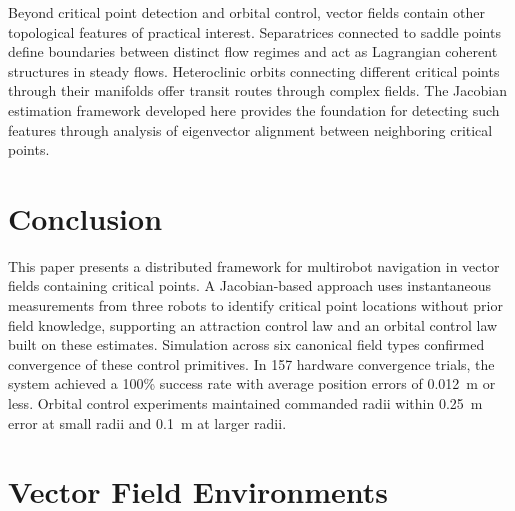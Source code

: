 \documentclass[lettersize,journal]{IEEEtran}
\begin{document}
Beyond critical point detection and orbital control, vector fields contain other topological features of practical interest. Separatrices connected to saddle points define boundaries between distinct flow regimes and act as Lagrangian coherent structures in steady flows. Heteroclinic orbits connecting different critical points through their manifolds offer transit routes through complex fields. The Jacobian estimation framework developed here provides the foundation for detecting such features through analysis of eigenvector alignment between neighboring critical points.



\section{Conclusion}
\noindent

This paper presents a distributed framework for multirobot navigation in vector fields containing critical points. A Jacobian-based approach uses instantaneous measurements from three robots to identify critical point locations without prior field knowledge, supporting an attraction control law and an orbital control law built on these estimates. Simulation across six canonical field types confirmed convergence of these control primitives. In 157 hardware convergence trials, the system achieved a 100\% success rate with average position errors of 0.012~m or less. Orbital control experiments maintained commanded radii within 0.25~m error at small radii and 0.1~m at larger radii.


\appendices

\section{Vector Field Environments}
\label{sec:appendix_vector_fields}
\end{document}
